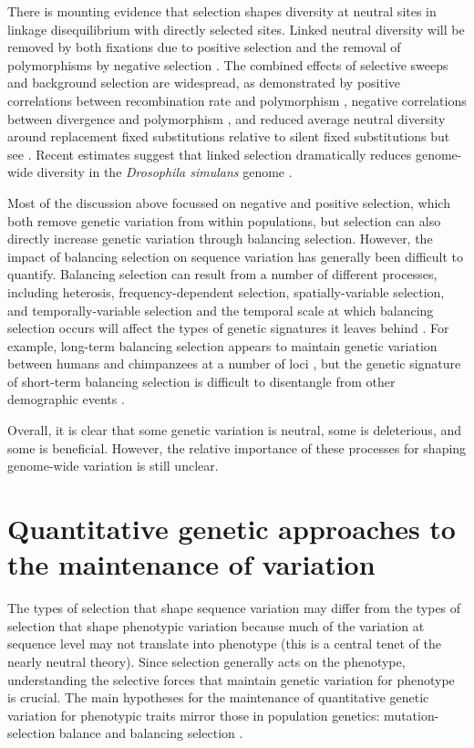 There is mounting evidence that selection shapes diversity at neutral sites in linkage disequilibrium with directly selected sites. Linked neutral diversity will be removed by both fixations due to positive selection \citep{Smith1974} and the removal of polymorphisms by negative selection \citep{Charlesworth1993-xx}. The combined effects of selective sweeps and background selection are widespread, as demonstrated by positive correlations between recombination rate and polymorphism \citep{Cutter2003-yq,Nachman1998-vc,Kim2007-ju,Begun2007-gh,Tenaillon2001-ai}, negative correlations between divergence and polymorphism \citep{Andolfatto2007-ew,Hahn2008-yj,Macpherson2007-pl}, and reduced average neutral diversity around replacement fixed substitutions relative to silent fixed substitutions \citep{Sattath2011-ns} but see \citep{hernandez2011}. Recent estimates suggest that linked selection dramatically reduces genome-wide diversity in the \textit{Drosophila simulans} genome \citep{Elyashiv2014-ic}.

Most of the discussion above focussed on negative and positive selection, which both remove genetic variation from within populations, but selection can also directly increase genetic variation through balancing selection. However, the impact of balancing selection on sequence variation has generally been difficult to quantify. Balancing selection can result from a number of different processes, including heterosis, frequency-dependent selection, spatially-variable selection, and temporally-variable selection \citep{Hedrick2006-ft,Hedrick1976-qp} and the temporal scale at which balancing selection occurs will affect the types of genetic signatures it leaves behind \citep{Charlesworth2006-mw}. For example, long-term balancing selection appears to maintain genetic variation between humans and chimpanzees at a number of loci \citep{Leffler2013-wr}, but the genetic signature of short-term balancing selection is difficult to disentangle from other demographic events \citep{Charlesworth2006-mw}.

Overall, it is clear that some genetic variation is neutral, some is deleterious, and some is beneficial. However, the relative importance of these processes for shaping genome-wide variation is still unclear.

\section{Quantitative genetic approaches to the maintenance of variation}
The types of selection that shape sequence variation may differ from the types of selection that shape phenotypic variation because much of the variation at sequence level may not translate into phenotype (this is a central tenet of the nearly neutral theory). Since selection generally acts on the phenotype, understanding the selective forces that maintain genetic variation for phenotype is crucial. The main hypotheses for the maintenance of quantitative genetic variation for phenotypic traits mirror those in population genetics: mutation-selection balance and balancing selection \citep{N_H_Barton1989-yu,Johnson2005-dl}.

